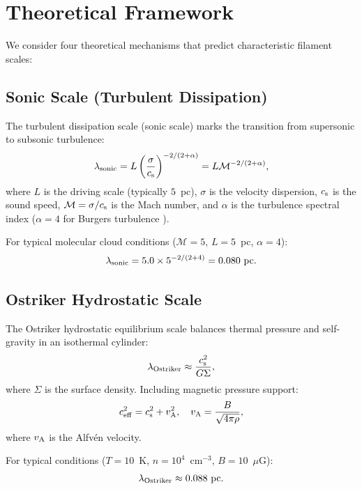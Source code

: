 \documentclass{mnras}
\begin{document}
\section{Theoretical Framework}
\label{sec:theory}

We consider four theoretical mechanisms that predict characteristic filament scales:

\subsection{Sonic Scale (Turbulent Dissipation)}

The turbulent dissipation scale (sonic scale) marks the transition from supersonic to subsonic turbulence:
\begin{equation}
\lambda_{\rm sonic} = L \left(\frac{\sigma}{c_{\rm s}}\right)^{-2/(2+\alpha)} = L \mathcal{M}^{-2/(2+\alpha)},
\label{eq:sonic}
\end{equation}
where $L$ is the driving scale (typically $5$~pc), $\sigma$ is the velocity dispersion, $c_{\rm s}$ is the sound speed, $\mathcal{M} = \sigma/c_{\rm s}$ is the Mach number, and $\alpha$ is the turbulence spectral index ($\alpha = 4$ for Burgers turbulence \citep{Burgers1948}).

For typical molecular cloud conditions ($\mathcal{M} = 5$, $L = 5$~pc, $\alpha = 4$):
\begin{equation}
\lambda_{\rm sonic} = 5.0 \times 5^{-2/(2+4)} = 0.080~\text{pc}.
\end{equation}

\subsection{Ostriker Hydrostatic Scale}

The Ostriker \citep{Ostriker1964} hydrostatic equilibrium scale balances thermal pressure and self-gravity in an isothermal cylinder:
\begin{equation}
\lambda_{\rm Ostriker} \approx \frac{c_{\rm s}^2}{G \Sigma},
\label{eq:ostriker}
\end{equation}
where $\Sigma$ is the surface density. Including magnetic pressure support:
\begin{equation}
c_{\rm eff}^2 = c_{\rm s}^2 + v_{\rm A}^2, \quad v_{\rm A} = \frac{B}{\sqrt{4\pi\rho}},
\end{equation}
where $v_{\rm A}$ is the Alfv\'en velocity.

For typical conditions ($T = 10$~K, $n = 10^4$~cm$^{-3}$, $B = 10$~$\mu$G):
\begin{equation}
\lambda_{\rm Ostriker} \approx 0.088~\text{pc}.
\end{equation}
\end{document}
